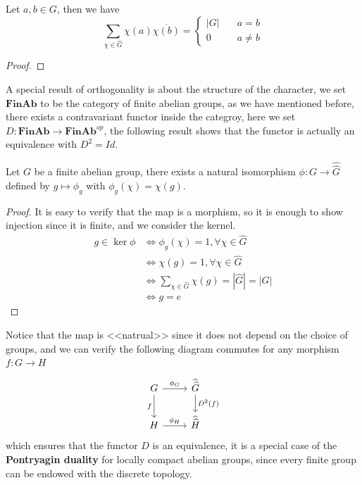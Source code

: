 \begin{colorcorollary}
    Let \(a,b \in G\), then we have 
    \[\sum_{\chi \in \hat{G}}\chi(a)\overline{\chi(b)} = \begin{cases}
        |G|  \quad &a = b \\
        0 \quad &a \neq b
    \end{cases}
\]
\end{colorcorollary}

\begin{proof}
    
\end{proof}

A special result of orthogonality is about the structure of the character, we set \(\mathbf{FinAb}\) to be the category of finite abelian groups, as we have mentioned before, there exists a contravariant functor inside the categroy, here we set \(D: \mathbf{FinAb} \to \mathbf{FinAb}^{op}\), the following result shows that the functor is actually an equivalence with \(D^2 = Id\).

\begin{colortheorem}
    Let \(G\) be a finite abelian group, there exists a natural isomorphism \(\phi: G \to \hat{\hat{G}}\) defined by \(g \mapsto \phi_g\) with \(\phi_g(\chi) = \chi(g) \).
\end{colortheorem}
\begin{proof}
    It is easy to verify that the map is a morphism, so it is enough to show injection since it is finite, and we consider the kernel.
    \begin{align*}
        g \in \ker \phi &\iff \phi_g(\chi) = 1, \forall \chi \in \hat{G} \\
        &\iff \chi(g) = 1, \forall \chi \in \hat{G} \\
        &\iff \sum_{\chi \in \hat{G}} \chi(g) = |\hat{G}| = |G| \\
        &\iff g = e
    \end{align*}
\end{proof}

\begin{remark}
    Notice that the map is <<natrual>> since it does not depend on the choice of groups, and we can verify the following diagram commutes for any morphism \(f: G \to H\)
    \[
\begin{tikzcd}
G \arrow[r,"\phi_G"] \arrow[d,"f"'] & \widehat{\widehat{G}} \arrow[d,"D^2(f)"] \\
H \arrow[r,"\phi_H"] & \widehat{\widehat{H}}
\end{tikzcd}
\]
    which ensures that the functor \(D\) is an equivalence, it is a special case of the \textbf{Pontryagin duality} for locally compact abelian groups, since every finite group can be endowed with the discrete topology.
\end{remark}







